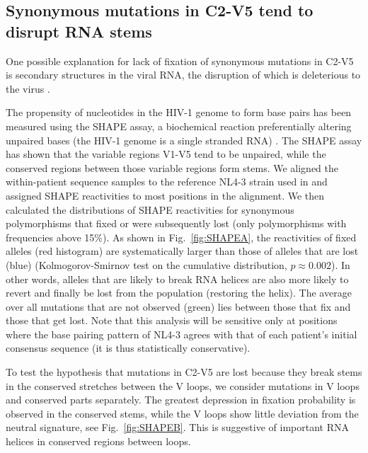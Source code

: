 \documentclass[rmp, twocolumn]{revtex4}
\newcommand{\FIG}[1]{Fig.~\ref{fig:#1}}
\newcommand{\shankaregion}{C2-V5}
\begin{document}
\subsection{Synonymous mutations in \shankaregion{} tend to disrupt RNA stems}
One possible explanation for lack of fixation of synonymous mutations in
\shankaregion{} is secondary structures in the viral RNA, the disruption of which
is deleterious to the virus \citep{forsdyke_reciprocal_1995,
snoeck_mapping_2011, sanjuan_interplay_2011}.

The propensity of nucleotides in the HIV-1 genome to form base pairs has been
measured using the SHAPE assay, a biochemical reaction preferentially altering
unpaired bases (the HIV-1 genome is a single stranded RNA)
\citep{watts_architecture_2009}. The SHAPE assay has shown that the variable
regions V1-V5 tend to be unpaired, while the conserved regions between those
variable regions form stems.  We aligned the within-patient sequence samples 
to the reference NL4-3 strain used in \citet{watts_architecture_2009} and 
assigned SHAPE reactivities to most positions in the alignment. 
We then calculated the distributions of SHAPE reactivities for synonymous 
polymorphisms that fixed or were subsequently lost (only polymorphisms with 
frequencies above 15\%).
As shown in \FIG{SHAPEA}, the reactivities of fixed alleles (red
histogram) are systematically larger than those of alleles that are lost (blue)
(Kolmogorov-Smirnov test on the cumulative distribution, $p\approx 0.002$). In
other words, alleles that are likely to break RNA helices are also more likely
to revert and finally be lost from the population (restoring the helix). The average over all
mutations that are not observed (green) lies between those that fix and
those that get lost. Note that this analysis will be sensitive only at positions
where the base pairing pattern of NL4-3 agrees with that of each patient's
initial consensus sequence (it is thus statistically conservative).

To test the hypothesis that mutations in \shankaregion{} are lost because they
break stems in the conserved stretches between the V loops, we consider
mutations in V loops and conserved parts separately. The greatest
depression in fixation probability is observed in the conserved stems, while the
V loops show little deviation from the neutral signature, see
\FIG{SHAPEB}. This is suggestive of important RNA helices in conserved
regions between loops.
\end{document}
